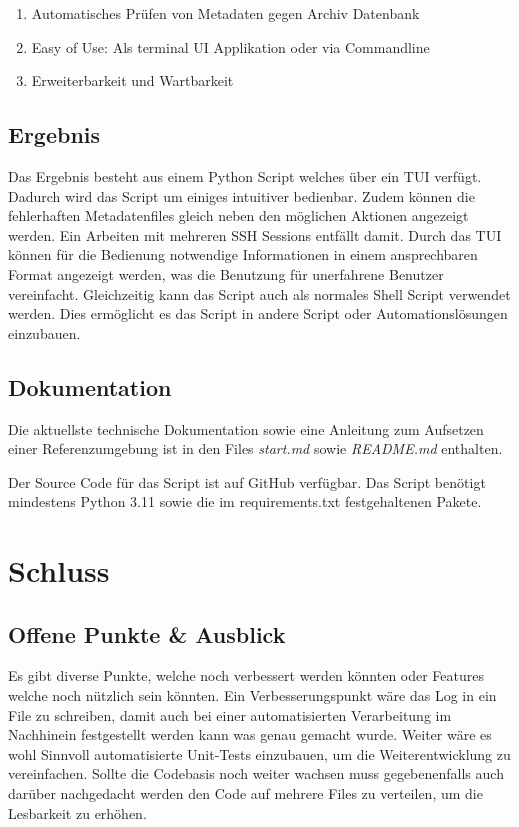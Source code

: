 \documentclass[a4paper,oneside, 12pt]{report}
\begin{document}
\begin{enumerate}
  \item Automatisches Prüfen von Metadaten gegen Archiv Datenbank
  \item Easy of Use: Als terminal UI Applikation oder via Commandline
  \item Erweiterbarkeit und Wartbarkeit
\end{enumerate}



\section{Ergebnis}
Das Ergebnis besteht aus einem Python Script welches über ein \ac{TUI} verfügt. Dadurch wird das Script um einiges intuitiver bedienbar. Zudem können die fehlerhaften Metadatenfiles gleich neben den möglichen Aktionen angezeigt werden. Ein Arbeiten mit mehreren SSH Sessions entfällt damit. Durch das \ac{TUI} können für die Bedienung notwendige Informationen in einem ansprechbaren Format angezeigt werden, was die Benutzung für unerfahrene Benutzer vereinfacht. Gleichzeitig kann das Script auch als normales Shell Script verwendet werden. Dies ermöglicht es das Script in andere Script oder Automationslösungen einzubauen.

\section{Dokumentation}
Die aktuellste technische Dokumentation sowie eine Anleitung zum Aufsetzen einer Referenzumgebung ist in den Files \textit{start.md} sowie \textit{README.md} enthalten.

Der Source Code für das Script ist auf GitHub verfügbar. Das Script benötigt mindestens Python 3.11 sowie die im requirements.txt festgehaltenen Pakete.


\chapter{Schluss}\label{sec:schluss}
\section{Offene Punkte \& Ausblick}
Es gibt diverse Punkte, welche noch verbessert werden könnten oder Features welche noch nützlich sein könnten. Ein Verbesserungspunkt wäre das Log in ein File zu schreiben, damit auch bei einer automatisierten Verarbeitung im Nachhinein festgestellt werden kann was genau gemacht wurde. Weiter wäre es wohl Sinnvoll automatisierte Unit-Tests einzubauen, um die Weiterentwicklung zu vereinfachen. Sollte die Codebasis noch weiter wachsen muss gegebenenfalls auch darüber nachgedacht werden den Code auf mehrere Files zu verteilen, um die Lesbarkeit zu erhöhen.
\end{document}
